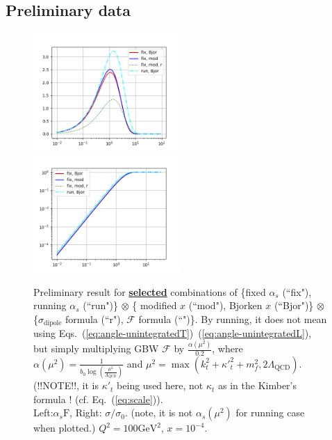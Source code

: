 \documentclass[12pt]{article}
\begin{document}
\subsection{Preliminary data}
\begin{figure}
\includegraphics[width=0.5\textwidth]{./preliminary.png}
\includegraphics[width=0.5\textwidth]{./preliminary-dipole.png}
\caption{\footnotesize Preliminary result for \underline{\textbf{selected}} combinations of \{fixed $\alpha_s$ (``fix"), running $\alpha_s$ (``run")\}  $\otimes$ \{ modified $x$ (``mod"), Bjorken $x$ (``Bjor")\}  $\otimes$ \{$\sigma_\mathrm{dipole}$ formula (``r"), $\mathcal{F}$ formula (``")\}.
By running, it does not mean using Eqs.~(\ref{eq:angle-unintegratedT})~(\ref{eq:angle-unintegratedL}), but simply multiplying GBW $\mathcal{F}$ by $\frac{ \alpha(\mu^2) }{0.2}$, where $\alpha(\mu^2)=\frac{1}{b_0 \log\left(\frac{\mu^2}{\Lambda_\mathrm{QCD} }\right)}$ and $\mu^2=\max( k^2_t+{\kappa'}_t^2+m_f^2,2\Lambda_\mathrm{QCD})$. (!!NOTE!!, it is ${\kappa'}_t$ being used here, not $\kappa_t$ as in the Kimber's formula ! (cf. Eq.~(\ref{eq:scale})).\\
Left:$ \alpha_s\mathrm{F}$, Right: $\sigma/\sigma_0$. (note, it is not $\alpha_s(\mu^2)$ for running case when plotted.) $Q^2=100\mathrm{GeV^2}$, $x=10^{-4}$.
}
\end{figure}
\end{document}
